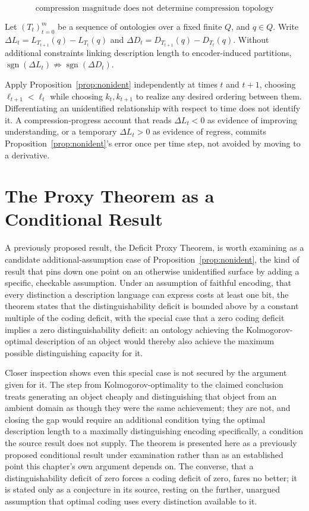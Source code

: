 \[
\boxed{\text{compression magnitude does not determine compression topology}}
\]

\begin{proposition}
\label{prop:dynamic}
Let $(T_t)_{t=0}^m$ be a sequence of ontologies over a fixed finite $Q$, and $q \in Q$. Write $\Delta L_t = L_{T_{t+1}}(q) - L_{T_t}(q)$ and $\Delta D_t = D_{T_{t+1}}(q) - D_{T_t}(q)$. Without additional constraints linking description length to encoder-induced partitions, $\operatorname{sgn}(\Delta L_t) \not\Rightarrow \operatorname{sgn}(\Delta D_t)$.
\end{proposition}

Apply Proposition~\ref{prop:nonident} independently at times $t$ and $t+1$, choosing $\ell_{t+1} < \ell_t$ while choosing $k_t, k_{t+1}$ to realize any desired ordering between them. Differentiating an unidentified relationship with respect to time does not identify it. A compression-progress account that reads $\Delta L_t < 0$ as evidence of improving understanding, or a temporary $\Delta L_t > 0$ as evidence of regress, commits Proposition~\ref{prop:nonident}'s error once per time step, not avoided by moving to a derivative.

\section{The Proxy Theorem as a Conditional Result}

A previously proposed result, the Deficit Proxy Theorem, is worth examining as a candidate additional-assumption case of Proposition~\ref{prop:nonident}, the kind of result that pins down one point on an otherwise unidentified surface by adding a specific, checkable assumption. Under an assumption of faithful encoding, that every distinction a description language can express costs at least one bit, the theorem states that the distinguishability deficit is bounded above by a constant multiple of the coding deficit, with the special case that a zero coding deficit implies a zero distinguishability deficit: an ontology achieving the Kolmogorov-optimal description of an object would thereby also achieve the maximum possible distinguishing capacity for it.

Closer inspection shows even this special case is not secured by the argument given for it. The step from Kolmogorov-optimality to the claimed conclusion treats generating an object cheaply and distinguishing that object from an ambient domain as though they were the same achievement; they are not, and closing the gap would require an additional condition tying the optimal description length to a maximally distinguishing encoding specifically, a condition the source result does not supply. The theorem is presented here as a previously proposed conditional result under examination rather than as an established point this chapter's own argument depends on. The converse, that a distinguishability deficit of zero forces a coding deficit of zero, fares no better; it is stated only as a conjecture in its source, resting on the further, unargued assumption that optimal coding uses every distinction available to it.


